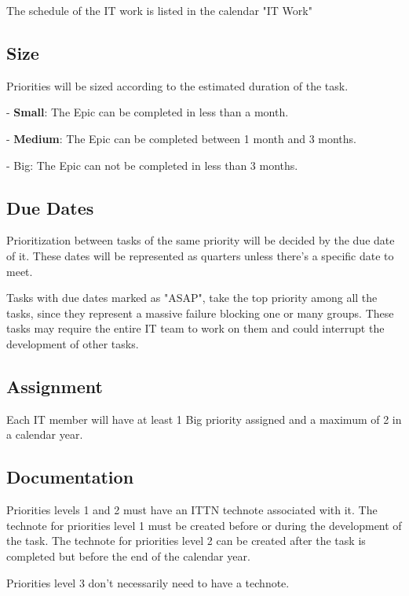 The schedule of the IT work is listed in the calendar "IT Work"

\subsection{Size }

Priorities will be sized according to the estimated duration of the task.

  - {\bf Small}: The Epic can be completed in less than a month.

  - {\bf Medium}: The Epic can be completed between 1 month and 3 months.

  - {\br Big}: The Epic can not be completed in less than 3 months.

\subsection{Due Dates }

Prioritization between tasks of the same priority will be decided by the due date of it. These dates will be represented as quarters unless there's a specific date to meet.

Tasks with due dates marked as "ASAP", take the top priority among all the tasks, since they represent a massive failure blocking one or many groups. These tasks may require the entire IT team to work on them and could interrupt the development of other tasks.

\subsection{Assignment }

Each IT member will have at least 1 Big priority assigned and a maximum of 2 in a calendar year.

\subsection{Documentation }

Priorities levels 1 and 2 must have an ITTN technote associated with it. The technote for priorities level 1 must be created before or during the development of the task. The technote for priorities level 2 can be created after the task is completed but before the end of the calendar year.

Priorities level 3 don't necessarily need to have a technote.
